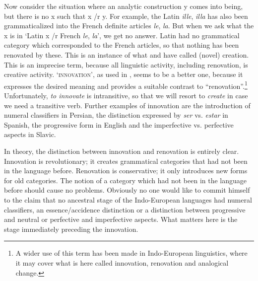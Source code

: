 Now consider the situation where an analytic construction y comes into being, but there is no x such that x /r y. For example, the Latin \textit{ille}, \textit{illa} has also been grammaticalized into the French definite articles \textit{le}, \textit{la}. But when we ask what the x is in ‘Latin x /r French \textit{le}, \textit{la}’, we get no answer. Latin had no grammatical category which corresponded to the French articles, so that nothing has been renovated by these. This is an instance of what \citet{Meillet1915} and \citet{Traugott1980} have called (novel) creation. This is an imprecise term, because all linguistic activity, including renovation, is creative activity. ‘\textsc{innovation}’, as used in \citet{Benveniste1968}, seems to be a better one, because it expresses the desired meaning and provides a suitable contrast to ``renovation''.\footnote{A wider use of this term has been made in Indo-European linguistics, where it may cover what is here called innovation, renovation and analogical change.} Unfortunately, \textit{to innovate }is intransitive, so that we will resort to \textit{create} in case we need a transitive verb. Further examples of innovation are the introduction of numeral classifiers in Persian, the distinction expressed by \textit{ser} vs. \textit{estar} in Spanish, the progressive form in English and the imperfective vs. perfective aspects in Slavic.

In theory, the distinction between innovation and renovation is entirely clear. Innovation is revolutionary; it creates grammatical categories that had not been in the language before. Renovation is conservative; it only introduces new forms for old categories. The notion of a category which had not been in the language before should cause no problems. Obviously no one would like to commit himself to the claim that no ancestral stage of the Indo-European languages had numeral classifiers, an essence/accidence distinction or a distinction between progressive and neutral or perfective and imperfective aspects. What matters here is the stage immediately preceding the innovation.

